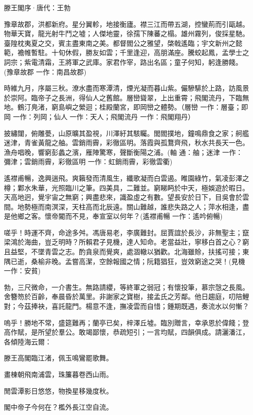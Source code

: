 \documentclass[12pt,a4paper]{ctexbook}
\begin{document}
滕王閣序·唐代：王勃 \par
豫章故郡，洪都新府。星分翼軫，地接衡廬。襟三江而帶五湖，控蠻荊而引甌越。物華天寶，龍光射牛鬥之墟；人傑地靈，徐孺下陳蕃之榻。雄州霧列，俊採星馳。臺隍枕夷夏之交，賓主盡東南之美。都督閻公之雅望，棨戟遙臨；宇文新州之懿範，襜帷暫駐。十旬休假，勝友如雲；千里逢迎，高朋滿座。騰蛟起鳳，孟學士之詞宗；紫電清霜，王將軍之武庫。家君作宰，路出名區；童子何知，躬逢勝餞。(豫章故郡 一作：南昌故郡)\par
時維九月，序屬三秋。潦水盡而寒潭清，煙光凝而暮山紫。儼驂騑於上路，訪風景於崇阿。臨帝子之長洲，得仙人之舊館。層巒聳翠，上出重霄；飛閣流丹，下臨無地。鶴汀鳧渚，窮島嶼之縈迴；桂殿蘭宮，即岡巒之體勢。（層巒 一作：層臺；即岡 一作：列岡；仙人 一作：天人；飛閣流丹 一作：飛閣翔丹）\par
披繡闥，俯雕甍，山原曠其盈視，川澤紆其駭矚。閭閻撲地，鐘鳴鼎食之家；舸艦迷津，青雀黃龍之舳。雲銷雨霽，彩徹區明。落霞與孤鶩齊飛，秋水共長天一色。漁舟唱晚，響窮彭蠡之濱，雁陣驚寒，聲斷衡陽之浦。(軸 通：舳；迷津 一作：彌津；雲銷雨霽，彩徹區明 一作：虹銷雨霽，彩徹雲衢)\par
遙襟甫暢，逸興遄飛。爽籟發而清風生，纖歌凝而白雲遏。睢園綠竹，氣凌彭澤之樽；鄴水朱華，光照臨川之筆。四美具，二難並。窮睇眄於中天，極娛遊於暇日。天高地迥，覺宇宙之無窮；興盡悲來，識盈虛之有數。望長安於日下，目吳會於雲間。地勢極而南溟深，天柱高而北辰遠。關山難越，誰悲失路之人；萍水相逢，盡是他鄉之客。懷帝閽而不見，奉宣室以何年？(遙襟甫暢 一作：遙吟俯暢)\par
嗟乎！時運不齊，命途多舛。馮唐易老，李廣難封。屈賈誼於長沙，非無聖主；竄梁鴻於海曲，豈乏明時？所賴君子見機，達人知命。老當益壯，寧移白首之心？窮且益堅，不墜青雲之志。酌貪泉而覺爽，處涸轍以猶歡。北海雖賒，扶搖可接；東隅已逝，桑榆非晚。孟嘗高潔，空餘報國之情；阮籍猖狂，豈效窮途之哭！(見機 一作：安貧)\par
勃，三尺微命，一介書生。無路請纓，等終軍之弱冠；有懷投筆，慕宗愨之長風。舍簪笏於百齡，奉晨昏於萬里。非謝家之寶樹，接孟氏之芳鄰。他日趨庭，叨陪鯉對；今茲捧袂，喜託龍門。楊意不逢，撫凌雲而自惜；鍾期既遇，奏流水以何慚？\par
嗚乎！勝地不常，盛筵難再；蘭亭已矣，梓澤丘墟。臨別贈言，幸承恩於偉餞；登高作賦，是所望於羣公。敢竭鄙懷，恭疏短引；一言均賦，四韻俱成。請灑潘江，各傾陸海云爾：\par
滕王高閣臨江渚，佩玉鳴鸞罷歌舞。\par
畫棟朝飛南浦雲，珠簾暮卷西山雨。\par
閒雲潭影日悠悠，物換星移幾度秋。\par
閣中帝子今何在？檻外長江空自流。\par
\end{document}
